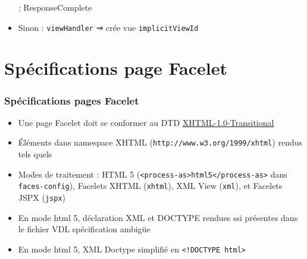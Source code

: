 \documentclass[english, french]{beamer}
\begin{document}
\begin{frame}
\begin{itemize}
{{		}} ; ResponseComplete
		\item Sinon : \texttt{viewHandler} ⇒ crée vue \texttt{implicitViewId}
	\end{itemize}
\end{frame}

\section{Spécifications page Facelet}
\begin{frame}
	\frametitle{Spécifications pages Facelet}
	\begin{itemize}
		\item Une page Facelet doit se conformer au DTD \href{http://www.w3.org/TR/xhtml1/\#a\_dtd\_XHTML-1.0-Transitional}{XHTML-1.0-Transitional}
		\item Éléments dans namespace XHTML {\tiny (\texttt{http://www.w3.org/1999/xhtml})} rendus tels quels
		\item Modes de traitement : HTML 5 (\texttt{<process-as>html5</process-as>} dans \texttt{faces-config}), Facelets XHTML (\texttt{xhtml}), XML View (\texttt{xml}), et Facelets JSPX (\texttt{jspx})
		\item En mode html 5, déclaration XML et DOCTYPE rendues ssi présentes dans le fichier VDL {\tiny spécification ambigüe}
		\item En mode html 5, XML Doctype simplifié en \texttt{<!DOCTYPE html>}
	\end{itemize}
\end{frame}
\end{document}
